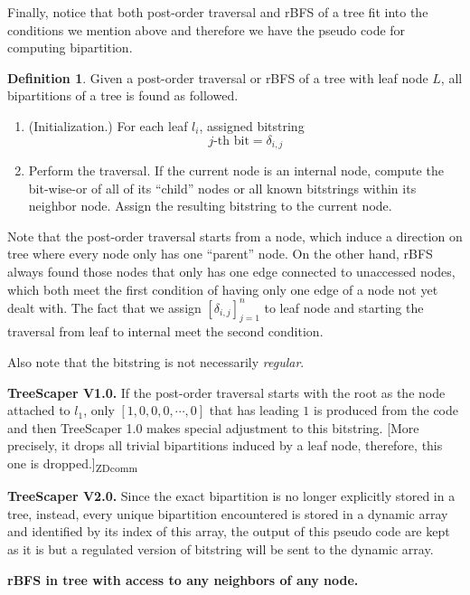 \documentclass[11pt]{article}
\theoremstyle{definition}
\newtheorem{defn}{Definition}[section]
\theoremstyle{remark}
\theoremstyle{plain}
\newcommand{\zdcomm}[1]{ {\color{blue} [#1]\textsubscript{ZDcomm}}}
\begin{document}
Finally, notice that both post-order traversal and rBFS of a tree fit into the conditions we mention above and therefore we have the pseudo code for computing bipartition. 

\begin{defn}
	Given a post-order traversal or rBFS of a tree with leaf node $L$, all bipartitions of a tree is found as followed.

	\begin{enumerate}
		\item (Initialization.) For each leaf $l_i$, assigned bitstring 
		\[
			j\text{-th bit} = \delta_{i,j}
		\]
		\item Perform the traversal. If the current node is an internal node, compute the bit-wise-or of all of its ``child'' nodes or all known bitstrings within its neighbor node. Assign the resulting bitstring to the current node.
	\end{enumerate}
\end{defn}

Note that the post-order traversal starts from a node, which induce a direction on tree where every node only has one ``parent'' node. On the other hand, rBFS always found those nodes that only has one edge connected to unaccessed nodes, which both meet the first condition of having only one edge of a node not yet dealt with. The fact that we assign $[\delta_{i,j}]_{j=1}^n$ to leaf node and starting the traversal from leaf to internal meet the second condition.

Also note that the bitstring is not necessarily \emph{regular}.

\noindent\textbf{TreeScaper V1.0.} If the post-order traversal starts with the root as the node attached to $l_1$, only $[1,0,0,0,\cdots,0]$ that has leading $1$ is produced from the code and then TreeScaper 1.0 makes special adjustment to this bitstring. \zdcomm{More precisely, it drops all trivial bipartitions induced by a leaf node, therefore, this one is dropped.}

\noindent\textbf{TreeScaper V2.0.} Since the exact bipartition is no longer explicitly stored in a tree, instead, every unique bipartition encountered is stored in a dynamic array and identified by its index of this array, the output of this pseudo code are kept as it is but a regulated version of bitstring will be sent to the dynamic array. 

\vspace{5mm}

\noindent\textbf{rBFS in tree with access to any neighbors of any node.}
\end{document}
